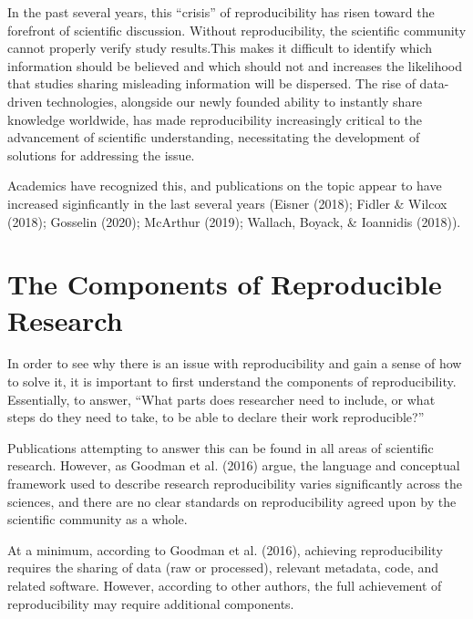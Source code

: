 \documentclass[12pt,twoside]{reedthesis}
\begin{document}
In the past several years, this ``crisis'' of reproducibility has risen toward the forefront of scientific discussion. Without reproducibility, the scientific community cannot properly verify study results.This makes it difficult to identify which information should be believed and which should not and increases the likelihood that studies sharing misleading information will be dispersed. The rise of data-driven technologies, alongside our newly founded ability to instantly share knowledge worldwide, has made reproducibility increasingly critical to the advancement of scientific understanding, necessitating the development of solutions for addressing the issue.

Academics have recognized this, and publications on the topic appear to have increased siginficantly in the last several years (Eisner (2018); Fidler \& Wilcox (2018); Gosselin (2020); McArthur (2019); Wallach, Boyack, \& Ioannidis (2018)).

\hypertarget{the-components-of-reproducible-research}{%
\section{The Components of Reproducible Research}\label{the-components-of-reproducible-research}}

In order to see why there is an issue with reproducibility and gain a sense of how to solve it, it is important to first understand the components of reproducibility. Essentially, to answer, ``What parts does researcher need to include, or what steps do they need to take, to be able to declare their work reproducible?''

Publications attempting to answer this can be found in all areas of scientific research. However, as Goodman et al. (2016) argue, the language and conceptual framework used to describe research reproducibility varies significantly across the sciences, and there are no clear standards on reproducibility agreed upon by the scientific community as a whole.

At a minimum, according to Goodman et al. (2016), achieving reproducibility requires the sharing of data (raw or processed), relevant metadata, code, and related software. However, according to other authors, the full achievement of reproducibility may require additional components.
\end{document}
